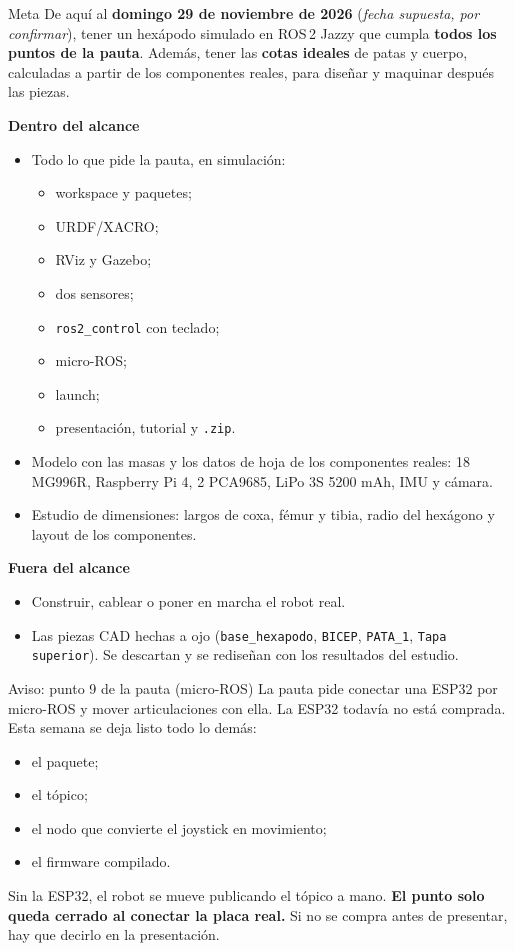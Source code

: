\documentclass[11pt,a4paper]{article}
\begin{document}
\begin{destacado}{Meta}
De aquí al \textbf{domingo 29 de noviembre de 2026} (\emph{fecha supuesta, por confirmar}), tener un hexápodo simulado en ROS\,2 Jazzy que cumpla \textbf{todos los puntos de la pauta}. Además, tener las \textbf{cotas ideales} de patas y cuerpo, calculadas a partir de los componentes reales, para diseñar y maquinar después las piezas.
\end{destacado}

\textbf{Dentro del alcance}
\begin{itemize}
  \item Todo lo que pide la pauta, en simulación:
  \begin{itemize}
    \item workspace y paquetes;
    \item URDF/XACRO;
    \item RViz y Gazebo;
    \item dos sensores;
    \item \texttt{ros2\_control} con teclado;
    \item micro-ROS;
    \item launch;
    \item presentación, tutorial y \texttt{.zip}.
  \end{itemize}
  \item Modelo con las masas y los datos de hoja de los componentes reales: 18 MG996R, Raspberry Pi 4, 2 PCA9685, LiPo 3S 5200 mAh, IMU y cámara.
  \item Estudio de dimensiones: largos de coxa, fémur y tibia, radio del hexágono y layout de los componentes.
\end{itemize}

\textbf{Fuera del alcance}
\begin{itemize}
  \item Construir, cablear o poner en marcha el robot real.
  \item Las piezas CAD hechas a ojo (\texttt{base\_hexapodo}, \texttt{BICEP}, \texttt{PATA\_1}, \texttt{Tapa superior}). Se descartan y se rediseñan con los resultados del estudio.
\end{itemize}

\begin{destacado}[sRojo]{Aviso: punto 9 de la pauta (micro-ROS)}
La pauta pide conectar una ESP32 por micro-ROS y mover articulaciones con ella. La ESP32 todavía no está comprada. Esta semana se deja listo todo lo demás:
\begin{itemize}
  \item el paquete;
  \item el tópico;
  \item el nodo que convierte el joystick en movimiento;
  \item el firmware compilado.
\end{itemize}
Sin la ESP32, el robot se mueve publicando el tópico a mano. \textbf{El punto solo queda cerrado al conectar la placa real.} Si no se compra antes de presentar, hay que decirlo en la presentación.
\end{destacado}
\end{document}
